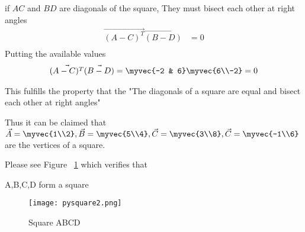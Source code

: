\documentclass[journal,12pt,twocolumn]{IEEEtran}
\begin{document}
if $AC$ and $BD$ are diagonals of the square, They must bisect each other at right angles
\begin{align}
\vec{(A-C)^T}\vec{(B-D)}&=0\\
\end{align}
Putting the available values
\begin{align}
\vec{(A-C)^T}\vec{(B-D)}=\myvec {-2 & 6}\myvec {6\\-2}= 0
\end{align}





This fulfills the property that the "The diagonals of a square are equal and bisect each other at right angles" 

Thus it can be claimed that $\vec {A}=\myvec {1\\2},
\vec {B}=\myvec {5\\4},
\vec {C}=\myvec {3\\8},
\vec {C}=\myvec {-1\\6}$ are the vertices of a square.

   
Please see Figure ~\ref{fig:Square ABCD} which verifies that

A,B,C,D form a square


\begin{figure}[h!]
\texttt{[image: pysquare2.png]}
  \caption{Square ABCD}
  \label{fig:Square ABCD}
\end{figure}
\end{document}
